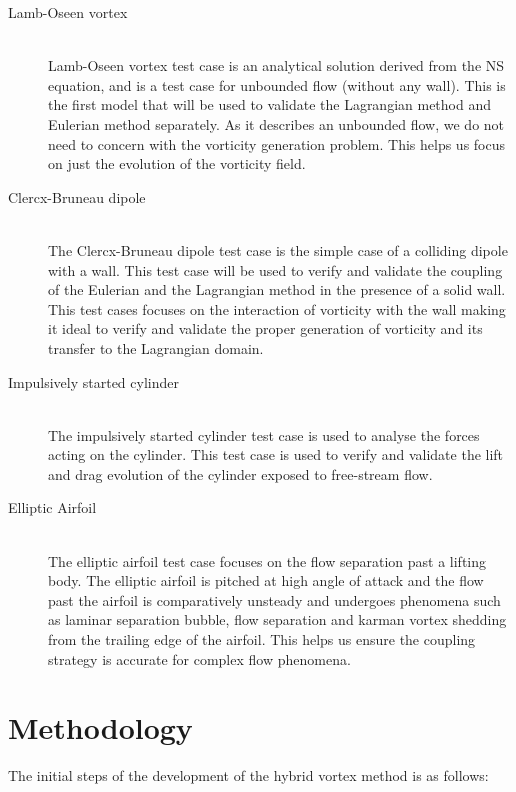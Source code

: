 	\begin{description}
	\item[Lamb-Oseen vortex] \cite{Lamb1993} \cite{Tryggeson2007} \hfill\\
	Lamb-Oseen vortex test case is an analytical solution derived from the NS equation, and is a test case for unbounded flow (without any wall). This is the first model that will be used to validate the Lagrangian method and Eulerian method separately. As it describes an unbounded flow, we do not need to concern with the vorticity generation problem. This helps us focus on just the evolution of the vorticity field.
	\item[Clercx-Bruneau dipole] \cite{Clercx2006a}\hfill\\
	The Clercx-Bruneau dipole test case is the simple case of a colliding dipole with a wall. This test case will be used to verify and validate the coupling of the Eulerian and the Lagrangian method in the presence of a solid wall. This test cases focuses on the interaction of vorticity with the wall making it ideal to verify and validate the proper generation of vorticity and its transfer to the Lagrangian domain.
	\item[Impulsively started cylinder] \cite{Koumoutsakos1995a} \cite{Chang1991} \cite{Braza1986} \cite{Lecointe1984}\hfill\\
	The impulsively started cylinder test case is used to analyse the forces acting on the cylinder. This test case is used to verify and validate the lift and drag evolution of the cylinder exposed to free-stream flow.
	\item[Elliptic Airfoil] \cite{Nair1997a}\hfill\\
	The elliptic airfoil test case focuses on the flow separation past a lifting body. The elliptic airfoil is pitched at high angle of attack and the flow past the airfoil is comparatively unsteady and undergoes phenomena such as laminar separation bubble, flow separation and karman vortex shedding from the trailing edge of the airfoil. This helps us ensure the coupling strategy is accurate for complex flow phenomena.
	\end{description}

\section{Methodology}
The initial steps of the development of the hybrid vortex method is as follows:

